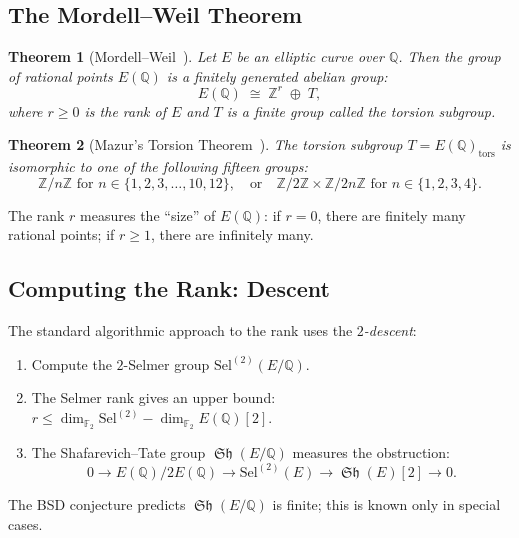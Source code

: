 \documentclass[12pt,a4paper]{article}
\newtheorem{theorem}{Theorem}[section]
\theoremstyle{remark}
\DeclareMathOperator{\Sha}{\mathfrak{Sh}}
\begin{document}
\subsection{The Mordell--Weil Theorem}

\begin{theorem}[Mordell--Weil~\cite{Mordell1922,Weil1928}]
  Let $E$ be an elliptic curve over $\mathbb{Q}$.  Then the group of rational points
  $E(\mathbb{Q})$ is a finitely generated abelian group:
  \begin{equation}\label{eq:mordellweil}
    E(\mathbb{Q}) \;\cong\; \mathbb{Z}^r \;\oplus\; T,
  \end{equation}
  where $r \geq 0$ is the \emph{rank} of $E$ and $T$ is a finite group called the
  \emph{torsion subgroup}.
\end{theorem}

\begin{theorem}[Mazur's Torsion Theorem~\cite{Mazur1977}]
  The torsion subgroup $T = E(\mathbb{Q})_{\mathrm{tors}}$ is isomorphic to one of the
  following fifteen groups:
  \[
    \mathbb{Z}/n\mathbb{Z} \text{ for } n \in \{1,2,3,\ldots,10,12\},
    \quad\text{or}\quad
    \mathbb{Z}/2\mathbb{Z} \times \mathbb{Z}/2n\mathbb{Z} \text{ for } n \in \{1,2,3,4\}.
  \]
\end{theorem}

The rank $r$ measures the ``size'' of $E(\mathbb{Q})$: if $r = 0$, there are finitely
many rational points; if $r \geq 1$, there are infinitely many.

\subsection{Computing the Rank: Descent}

The standard algorithmic approach to the rank uses the \emph{$2$-descent}:
\begin{enumerate}[nosep]
  \item Compute the $2$-Selmer group $\mathrm{Sel}^{(2)}(E/\mathbb{Q})$.
  \item The Selmer rank gives an upper bound: $r \leq \dim_{\mathbb{F}_2}\mathrm{Sel}^{(2)} - \dim_{\mathbb{F}_2} E(\mathbb{Q})[2]$.
  \item The Shafarevich--Tate group $\Sha(E/\mathbb{Q})$ measures the obstruction:
  \[
    0 \to E(\mathbb{Q})/2E(\mathbb{Q}) \to \mathrm{Sel}^{(2)}(E) \to \Sha(E)[2] \to 0.
  \]
\end{enumerate}

The BSD conjecture predicts $\Sha(E/\mathbb{Q})$ is finite; this is known only in special
cases.
\end{document}
